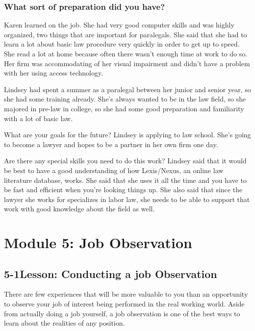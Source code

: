 \subsubsection*{What sort of preparation did you have?}

Karen learned on the job. She had very good computer skills and was highly organized, two things that are important for paralegals. She said that she had to learn a lot about basic law procedure very quickly in order to get up to speed. She read a lot at home because often there wasn't enough time at work to do so. Her firm was accommodating of her visual impairment and didn't have a problem with her using access technology.

Lindsey had spent a summer as a paralegal between her junior and senior year, so she had some training already. She's always wanted to be in the law field, so she majored in pre-law in college, so she had some good preparation and familiarity with a lot of basic law.

What are your goals for the future? Lindsey is applying to law school. She's going to become a lawyer and hopes to be a partner in her own firm one day.

Are there any special skills you need to do this work? Lindsey said that it would be best to have a good understanding of how Lexis/Nexus, an online law literature database, works. She said that she uses it all the time and you have to be fast and efficient when you're looking things up. She also said that since the lawyer she works for specializes in labor law, she needs to be able to support that work with good knowledge about the field as well.

\pagebreak \section*{Module 5:	Job Observation}
\noindent\makebox[\textwidth]{\rule{\linewidth}{0.4pt}}  \localtableofcontents
\noindent\makebox[\textwidth]{\rule{\linewidth}{0.4pt}}


\pagebreak \subsection*{5-1\quad Lesson: Conducting a job Observation}
There are few experiences that will be more valuable to you than an opportunity to observe your job of interest being performed in the real working world. Aside from actually doing a job yourself, a job observation is one of the best ways to learn about the realities of any position.

